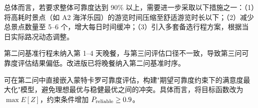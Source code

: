 总体而言，若要求整体可靠度达到 90\% 以上，需要进一步采取以下措施之一：（1）将高耗时景点（如 A2 海洋乐园）的游览时间压缩至舒适游览时长以下；（2）减少总景点数量至 5--6 个，增大每日时间缓冲；（3）引入多套备选行程方案，根据当日实际路况动态调整。


\item 第二问基准行程未纳入第 1--4 天晚餐，与第三问评估口径不一致，导致第三问可靠度评估结果偏低。改进版已将晚餐纳入第二问基准时序。

\item 可在第二问中直接嵌入蒙特卡罗可靠度评估，构建"期望可靠度约束下的满意度最大化"模型，避免理想最优与稳健最优之间的冲突。具体而言，将目标函数改为 $\max E[Z]$，约束条件增加 $P_{\rm reliable} \geq 0.9$。
